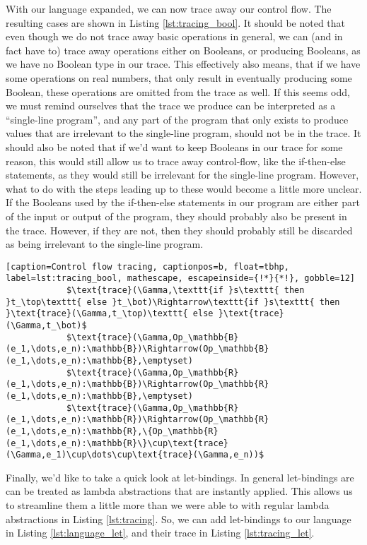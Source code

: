         With our language expanded, we can now trace away our control flow.
        The resulting cases are shown in Listing \ref{lst:tracing_bool}.
        It should be noted that even though we do not trace away basic operations in general, we can (and in fact have to) trace away operations either on Booleans, or producing Booleans, as we have no Boolean type in our trace.
        This effectively also means, that if we have some operations on real numbers, that only result in eventually producing some Boolean, these operations are omitted from the trace as well.
        If this seems odd, we must remind ourselves that the trace we produce can be interpreted as a ``single-line program'', and any part of the program that only exists to produce values that are irrelevant to the single-line program, should not be in the trace.
        It should also be noted that if we'd want to keep Booleans in our trace for some reason, this would still allow us to trace away control-flow, like the if-then-else statements, as they would still be irrelevant for the single-line program.
        However, what to do with the steps leading up to these would become a little more unclear.
        If the Booleans used by the if-then-else statements in our program are either part of the input or output of the program, they should probably also be present in the trace.
        However, if they are not, then they should probably still be discarded as being irrelevant to the single-line program.

        \begin{lstlisting}[caption=Control flow tracing, captionpos=b, float=tbhp, label=lst:tracing_bool, mathescape, escapeinside={!*}{*!}, gobble=12]
            $\text{trace}(\Gamma,\texttt{if }s\texttt{ then }t_\top\texttt{ else }t_\bot)\Rightarrow\texttt{if }s\texttt{ then }\text{trace}(\Gamma,t_\top)\texttt{ else }\text{trace}(\Gamma,t_\bot)$
            $\text{trace}(\Gamma,Op_\mathbb{B}(e_1,\dots,e_n):\mathbb{B})\Rightarrow(Op_\mathbb{B}(e_1,\dots,e_n):\mathbb{B},\emptyset)
            $\text{trace}(\Gamma,Op_\mathbb{R}(e_1,\dots,e_n):\mathbb{B})\Rightarrow(Op_\mathbb{R}(e_1,\dots,e_n):\mathbb{B},\emptyset)
            $\text{trace}(\Gamma,Op_\mathbb{R}(e_1,\dots,e_n):\mathbb{R})\Rightarrow(Op_\mathbb{R}(e_1,\dots,e_n):\mathbb{R},\{Op_\mathbb{R}(e_1,\dots,e_n):\mathbb{R}\}\cup\text{trace}(\Gamma,e_1)\cup\dots\cup\text{trace}(\Gamma,e_n))$
        \end{lstlisting}

        Finally, we'd like to take a quick look at let-bindings.
        In general let-bindings are can be treated as lambda abstractions that are instantly applied.
        This allows us to streamline them a little more than we were able to with regular lambda abstractions in Listing \ref{lst:tracing}.
        So, we can add let-bindings to our language in Listing \ref{lst:language_let}, and their trace in Listing \ref{lst:tracing_let}.

